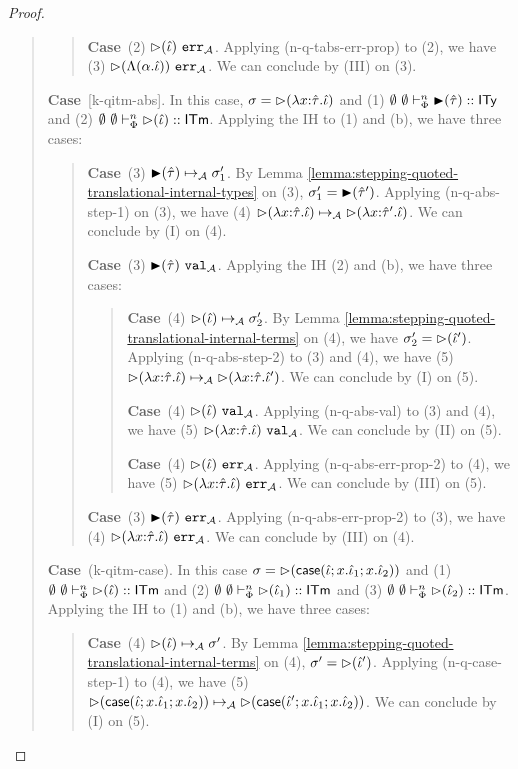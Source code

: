 \documentclass[12pt]{article}
\newcommand{\pfcase}[1]{\textbf{Case}~#1. }
\begin{document}
\begin{proof}
\begin{quote}
\begin{quote}
        \pfcase{(2) $\serrA{\sqitm{\qitm}}$} Applying (n-q-tabs-err-prop) to (2), we have (3) $\serrA{\sqitm{\iLam{\alpha}{\qitm}}}$. We can conclude by (III) on (3).
    \end{quote}

    \pfcase{[k-qitm-abs]} In this case, $\st=\sqitm{\ilam{\qity}{x}{\qitm}}$ and (1) $\sofkVX{\sqity{\qity}}{\kity}$ and (2) $\sofkVX{\sqitm{\qitm}}{\kitm}$. Applying the IH to (1) and (b), we have three cases:

    \begin{quote}
        \pfcase{(3) $\sstepA{\sqity{\qity}}{\st_1'}$} By Lemma \ref{lemma:stepping-quoted-translational-internal-types} on (3), $\st_1'=\sqity{\qity'}$. Applying (n-q-abs-step-1) on (3), we have (4) $\sstepA{\sqitm{\ilam{\qity}{x}{\qitm}}}{\sqitm{\ilam{\qity'}{x}{\qitm}}}$. We can conclude by (I) on (4).

        \pfcase{(3) $\svalA{\sqity{\qity}}$} Applying the IH (2) and (b), we have three cases:
        \begin{quote}
            \pfcase{(4) $\sstepA{\sqitm{\qitm}}{\st_2'}$} By Lemma \ref{lemma:stepping-quoted-translational-internal-terms} on (4), we have $\st_2'=\sqitm{\qitm'}$. Applying (n-q-abs-step-2) to (3) and (4), we have (5) $\qstep{\ilam{\qity}{x}{\qitm}}{\ilam{\qity}{x}{\qitm'}}$. We can conclude by (I) on (5).

            \pfcase{(4) $\qval{\qitm}$} Applying (n-q-abs-val) to (3) and (4), we have (5) $\qval{\ilam{\qity}{x}{\qitm}}$. We can conclude by (II) on (5).

            \pfcase{(4) $\qerr{\qitm}$} Applying (n-q-abs-err-prop-2) to (4), we have (5) $\qerr{\ilam{\qity}{x}{\qitm}}$. We can conclude by (III) on (5).
        \end{quote}

        \pfcase{(3) $\serrA{\sqity{\qity}}$} Applying (n-q-abs-err-prop-2) to (3), we have (4) $\qerr{\ilam{\qity}{x}{\qitm}}$. We can conclude by (III) on (4).
    \end{quote}

    \pfcase{(k-qitm-case)} In this case $\st=\sqitm{\icase{\qitm}{x}{\qitm_1}{x}{\qitm_2}}$ and (1) $\sofkVX{\sqitm{\qitm}}{\kitm}$ and (2) $\sofkVX{\sqitm{\qitm_1}}{\kitm}$ and (3) $\sofkVX{\sqitm{\qitm_2}}{\kitm}$. Applying the IH to (1) and (b), we have three cases:

    \begin{quote}
        \pfcase{(4) $\sstepA{\sqitm{\qitm}}{\st'}$} By Lemma \ref{lemma:stepping-quoted-translational-internal-terms} on (4), $\st'=\sqitm{\qitm'}$. Applying (n-q-case-step-1) to (4), we have (5) $\sstepA{\sqitm{\icase{\qitm}{x}{\qitm_1}{x}{\qitm_2}}}{\sqitm{\icase{\qitm'}{x}{\qitm_1}{x}{\qitm_2}}}$. We can conclude by (I) on (5).


\end{quote}
\end{quote}
\end{proof}
\end{document}
